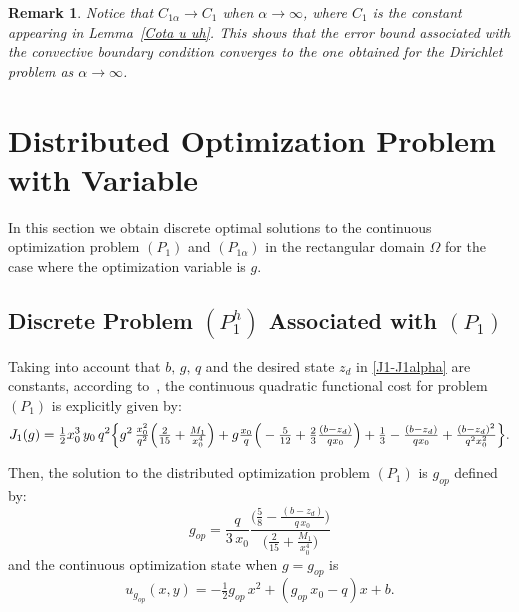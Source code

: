 \documentclass[11pt]{article}
\newtheorem{Remark}{Remark}
\begin{document}
\begin{Remark}
Notice that $C_{1\alpha}\to C_1$ when $\alpha\to \infty$, where $C_1$ is {the constant appearing} in Lemma~\ref{Cota u uh}. This shows that the error bound associated with the convective boundary condition converges to the one obtained for the Dirichlet problem as $\alpha \to \infty$.

\end{Remark}


\section{Distributed Optimization Problem with Variable }\label{sec3}   %
In this section we obtain  discrete optimal  solutions to the continuous optimization problem $(P_1)$ and $(P_{1\alpha})$ in the rectangular domain $\Omega$ for the case where the optimization variable is $g$.

\subsection{Discrete Problem  ${(P^h_{1})}$ Associated with $(P_1)$}\label{sec3.1}
 
 Taking into account that $b, \,g,\,q$ and  the desired state $z_d$  in \eqref{J1-J1alpha} are constants, according to~\cite{BoGaTa2020}, the continuous quadratic  functional cost for problem $(P_1)$ is explicitly given by:
\begin{equation} \label{J1-explicito}   
    J_1(g)= \tfrac{1}{2} x_0^3\, y_0\, q^2 \Big\{ g^2 \,\tfrac{x_0^2}{q^2} \Big(\tfrac{2}{15}  + \tfrac{M_1}{x_0^4} \Big) + g \tfrac{x_0}{q}  \Big(- \tfrac{5}{12}  + \tfrac{2}{3} \tfrac{(b- z_d)}{q x_0} \Big) + \\
    \tfrac{1}{3} - \tfrac{(b-z_d)}{q x_0} + \tfrac{(b-z_d)^2}{q^2x_0^2} \Big\}.
    \end{equation}
    
    
\noindent Then, the solution to the distributed optimization problem $(P_1)$ is $g_{op}$ defined by:
     \begin{equation}\label{gop}
          g_{op} = \frac{q}{3\, x_0} \frac{\Big( \tfrac{5}{8 } -\tfrac{ (b -z_d)}{q \, x_0}\Big)}{\Big(\tfrac{2}{15} + \tfrac{M_1}{x_0^4} \Big)}
     \end{equation}
   \noindent and the continuous optimization state when $g=g_{op}$ is     
       \begin{equation}\label{ugop}
            u_{g_{op}}(x,y) = -\tfrac{1}{2} g_{op}\, x^2 + (g_{op}\, x_0 - q) x +b.
       \end{equation}        
 
\end{document}
